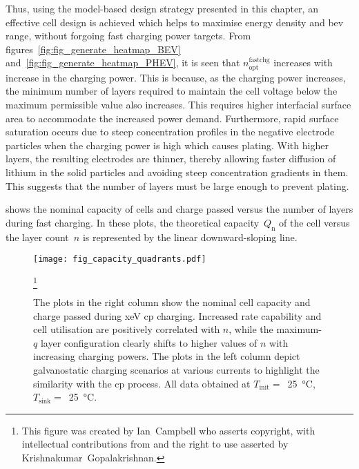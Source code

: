 Thus,   using    the   model-based    design   strategy   presented    in   this
chapter,   an   effective    cell   design   is   achieved    which   helps   to
maximise   energy   density  and   \gls{bev}   range,   without  forgoing   fast
charging   power    targets.   From   figures~\ref{fig:fig_generate_heatmap_BEV}
and~\ref{fig:fig_generate_heatmap_PHEV},       it       is       seen       that
$n^\text{fastchg}_\text{opt}$  increases with  increase in  the charging  power.
This is because,  as the charging power increases, the  minimum number of layers
required to maintain  the cell voltage below the maximum  permissible value also
increases.  This requires  higher interfacial  surface area  to accommodate  the
increased  power demand.  Furthermore, rapid  surface saturation  occurs due  to
steep  concentration  profiles in  the  negative  electrode particles  when  the
charging power is  high which causes plating. With higher  layers, the resulting
electrodes  are thinner,  thereby allowing  faster diffusion  of lithium  in the
solid  particles  and  avoiding  steep concentration  gradients  in  them.  This
suggests that the number of layers must be large enough to prevent plating.

 shows the nominal  capacity of cells and charge
passed versus  the number of  layers during fast  charging. In these  plots, the
theoretical  capacity~$Q_\text{n}$ of  the cell  versus the  layer count~$n$  is
represented by the linear downward-sloping line.

\begin{figure}[!bp]
    \begin{minipage}[t]{\textwidth}
        \centering \texttt{[image: fig\_capacity\_quadrants.pdf]}
        \captionsetup{labelsep=note}
        \caption[
        Nominal capacity and charge passed versus layer count for ---
        \emph{a}) constant current  charging and \emph{b}) constant power  charging
        ]
        {
            The plots in the right column show the nominal cell capacity and charge passed
            during \gls{xeV} \gls{cp} charging. Increased rate capability and cell utilisation are positively
            correlated with $n$, while the maximum-$q$ layer configuration clearly shifts to higher
            values of $n$ with increasing charging powers. The plots in the left column depict
            galvanostatic charging scenarios at various currents to highlight the similarity with the
            \gls{cp} process. All data obtained at \mbox{$T_\text{init} =$
            \SI{25}{\degreeCelsius}, $T_\text{sink} =$ \SI{25}{\degreeCelsius}}.
        }
        \label{fig:fig_CapacityQuadrants}
        \mpfootnotes[1]
        \footnote{This figure was created by \mbox{Ian Campbell} who asserts copyright,
            with intellectual contributions from and the right to use asserted by
        \mbox{Krishnakumar Gopalakrishnan}.}
    \end{minipage}
\end{figure}

